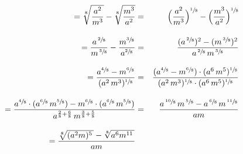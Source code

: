 \documentclass[12pt, twocolumn, landscape, a4paper]{article}
\begin{document}
\begin{itemize}
{\begin{eqnarray*}
= \sqrt[8]{\dfrac{a^2}{m^3}} - \sqrt[8]{\dfrac{m^3}{a^2}} &=& \Big(\dfrac{a^2}{m^3}\Big)^{\sfrac{1}{8}} - \Big(\dfrac{m^3}{a^2}\Big)^{\sfrac{1}{8}} \\[11pt]
= \dfrac{a^{\,\sfrac{2}{8}}}{m^{\,\sfrac{3}{8}}} - \dfrac{m^{\sfrac{3}{8}}}{a^{\sfrac{2}{8}}} &=& \dfrac{(a^{\,\sfrac{2}{8}})^{2} - (m^{\,\sfrac{3}{8}})^{2}}{ a^{\,\sfrac{2}{8}}\,m^{\,\sfrac{3}{8}} } \\[10pt]
= \dfrac{a^{\sfrac{4}{8}} - m^{\sfrac{6}{8}}} { (a^{2}\,m^{3})^{\sfrac{1}{8}}} &=& \dfrac{(a^{\sfrac{4}{8}} - m^{\sfrac{6}{8}}) \cdot (a^{6}\,m^{5})^{\sfrac{1}{8}}}{(a^{2}\,m^{3})^{\sfrac{1}{8}} \cdot (a^{6}\,m^{5})^{\sfrac{1}{8}}} \\[10pt]
= \dfrac{a^{ \sfrac{4}{8} }\cdot (a^{ \sfrac{6}{8} }\,m^{ \sfrac{5}{8} }) - m^{ \sfrac{6}{8} }\cdot (a^{ \sfrac{6}{8} }\,m^{ \sfrac{5}{8} })}{a^{\frac{2}{8} + \frac{6}{8}}\,m^{\frac{3}{8} + \frac{5}{8}}} &=& \dfrac{ a^{\,\sfrac{10}{8} } \,m^{\,\sfrac{5}{8} } - a^{\,\sfrac{6}{8} } \,m^{\,\sfrac{11}{8} } }{am} \\[10pt]
= \dfrac{\sqrt[8]{(a^{2}m)^{5}\,} - \sqrt[8]{a^{6}m^{11}\,}}{am}
\end{eqnarray*}}
\end{itemize}
\end{document}
